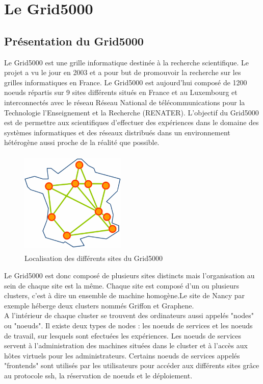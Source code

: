 \documentclass [10pt,a4paper]{report}
\begin{document}
\part{Le Grid5000}
	\chapter{Présentation du Grid5000}
Le Grid5000 est une grille informatique destinée à la recherche scientifique. Le projet a vu le jour en 2003 et a pour but de promouvoir la recherche sur les grilles informatiques en France. Le Grid5000 est aujourd'hui composé de 1200 noeuds répartis sur 9 sites différents situés en France et au Luxembourg et interconnectés avec le réseau Réseau National de télécommunications pour la Technologie l'Enseignement et la Recherche (RENATER). L'objectif du Grid5000 est de permettre aux scientifiques d'effectuer des expériences dans le domaine des systèmes informatiques et des réseaux distribués dans un environnement hétérogène aussi proche de la réalité que possible.

	\begin{figure}[!h]
		\centering
   		\includegraphics[width=5cm,height=5cm]{map.png}
   		\caption{Localisation des différents sites du Grid5000}
    	\label{fig:map}
	\end{figure} 

Le Grid5000 est donc composé de plusieurs sites distincts mais l'organisation au sein de chaque site est la même. Chaque site est composé d'un ou plusieurs clusters, c'est à dire un ensemble de machine homogène.Le site de Nancy par exemple héberge deux clusters nommés Griffon et Graphene. \\
A l'intérieur de chaque cluster se trouvent des ordinateurs aussi appelés "nodes" ou "noeuds". Il existe deux types de nodes : les noeuds de services et les noeuds de travail, sur lesquels sont efectuées les expériences. Les noeuds de services servent à l'administration des machines situées dans le cluster et à l'accès aux hôtes virtuels pour les administrateurs. Certains noeuds de services appelés "frontends" sont utilisés par les utilisateurs pour accéder aux différents sites grâce au protocole ssh, la réservation de noeuds et le déploiement. 
\end{document}
